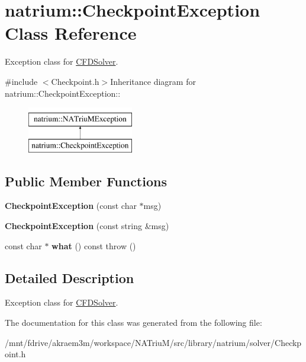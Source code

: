 \hypertarget{classnatrium_1_1CheckpointException}{
\section{natrium::CheckpointException Class Reference}
\label{classnatrium_1_1CheckpointException}
}


Exception class for \hyperlink{classnatrium_1_1CFDSolver}{CFDSolver}.  


{\ttfamily \#include $<$Checkpoint.h$>$}Inheritance diagram for natrium::CheckpointException::\begin{figure}[H]
\begin{center}
\leavevmode
\includegraphics[height=2cm]{classnatrium_1_1CheckpointException}
\end{center}
\end{figure}
\subsection*{Public Member Functions}
\begin{DoxyCompactItemize}
\item 
\hypertarget{classnatrium_1_1CheckpointException_ae290a3ee4789a56b69561f6d339be0fa}{
{\bfseries CheckpointException} (const char $\ast$msg)}
\label{classnatrium_1_1CheckpointException_ae290a3ee4789a56b69561f6d339be0fa}

\item 
\hypertarget{classnatrium_1_1CheckpointException_a821774598aa17b83c0fd126677b42019}{
{\bfseries CheckpointException} (const string \&msg)}
\label{classnatrium_1_1CheckpointException_a821774598aa17b83c0fd126677b42019}

\item 
\hypertarget{classnatrium_1_1CheckpointException_a47b6dca60268391fbbf2ab359129396c}{
const char $\ast$ {\bfseries what} () const   throw ()}
\label{classnatrium_1_1CheckpointException_a47b6dca60268391fbbf2ab359129396c}

\end{DoxyCompactItemize}


\subsection{Detailed Description}
Exception class for \hyperlink{classnatrium_1_1CFDSolver}{CFDSolver}. 

The documentation for this class was generated from the following file:\begin{DoxyCompactItemize}
\item 
/mnt/fdrive/akraem3m/workspace/NATriuM/src/library/natrium/solver/Checkpoint.h\end{DoxyCompactItemize}
